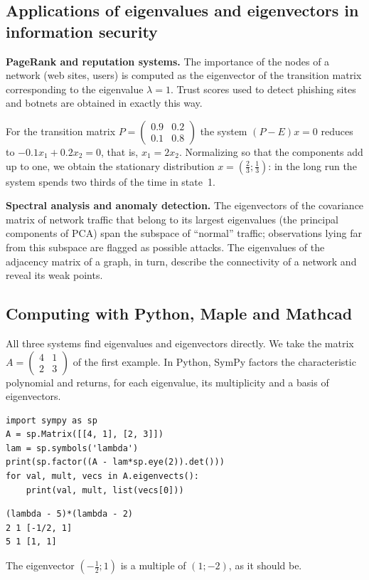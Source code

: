 \subsection{Applications of eigenvalues and eigenvectors in information security}

\textbf{PageRank and reputation systems.} The importance of the nodes of a
network (web sites, users) is computed as the eigenvector of the
transition matrix corresponding to the eigenvalue $\lambda=1$. Trust
scores used to detect phishing sites and botnets are obtained in exactly
this way.

\begin{misol}
For the transition matrix
$P=\begin{pmatrix}0.9&0.2\\0.1&0.8\end{pmatrix}$ the system $(P-E)x=0$
reduces to $-0.1x_1+0.2x_2=0$, that is, $x_1=2x_2$. Normalizing so that
the components add up to one, we obtain the stationary distribution
$x=\left(\frac23;\frac13\right)$: in the long run the system spends
two thirds of the time in state~1.
\end{misol}

\textbf{Spectral analysis and anomaly detection.} The eigenvectors of the
covariance matrix of network traffic that belong to its largest
eigenvalues (the principal components of PCA) span the subspace of
“normal” traffic; observations lying far from this subspace are flagged
as possible attacks. The eigenvalues of the adjacency matrix of a graph,
in turn, describe the connectivity of a network and reveal its weak
points.

\subsection{Computing with Python, Maple and Mathcad}

All three systems find eigenvalues and eigenvectors directly. We take the
matrix $A=\begin{pmatrix}4&1\\2&3\end{pmatrix}$ of the first example. In
Python, SymPy factors the characteristic polynomial and returns, for each
eigenvalue, its multiplicity and a basis of eigenvectors.
\begin{Verbatim}[fontsize=\footnotesize,frame=single,label={\small Python}]
import sympy as sp
A = sp.Matrix([[4, 1], [2, 3]])
lam = sp.symbols('lambda')
print(sp.factor((A - lam*sp.eye(2)).det()))
for val, mult, vecs in A.eigenvects():
    print(val, mult, list(vecs[0]))
\end{Verbatim}
\begin{Verbatim}[fontsize=\footnotesize,frame=single,label={\small Output}]
(lambda - 5)*(lambda - 2)
2 1 [-1/2, 1]
5 1 [1, 1]
\end{Verbatim}
The eigenvector $(-\frac12;1)$ is a multiple of $(1;-2)$, as it should be.


